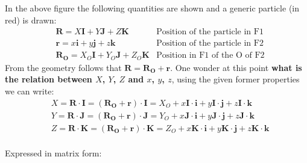 \noindent
In the above figure the following quantities are shown and a generic particle {\color{red}(in red)} is drawn: 
\begin{equation}
    \begin{aligned}
        &\mathbf{R} = X\mathbf{I} + Y \mathbf{J} + Z \mathbf{K}
        &\text{Position of the particle in F1}\\
        &\mathbf{r} = x \mathbf{i} + y \mathbf{j} + z \mathbf{k}
        &\text{Position of the particle in F2}\\
        &\mathbf{R_O}=X_O \mathbf{I} + Y_O \mathbf{J} + Z_O \mathbf{K}
        &\text{Position in F1 of the O of F2}
    \end{aligned}
\end{equation}
From the geometry follows that $\mathbf{R=R_O+r}$. One wonder at this point \textbf{what is the relation between $X$, $Y$, $Z$ and $x$, $y$, $z$}, using the given former properties we can write:
\begin{equation*}
    \begin{aligned}
        &X = \mathbf{R \cdot I} = \mathbf{(R_O+r) \cdot I} = 
        X_O + x\mathbf{I \cdot i} + y\mathbf{I \cdot j} + 
        z\mathbf{I \cdot k}\\ 
        &Y = \mathbf{R \cdot J} = \mathbf{(R_O+r) \cdot J} = Y_O + x\mathbf{J \cdot i} + y\mathbf{J \cdot j} + 
        z\mathbf{J \cdot k} 
         \\
        &Z = \mathbf{R \cdot K} = \mathbf{(R_O+r) \cdot K} =Z_O + x\mathbf{K \cdot i} + y\mathbf{K \cdot j} + 
        z\mathbf{K \cdot k} \\    
    \end{aligned}
\end{equation*}

Expressed in matrix form:

